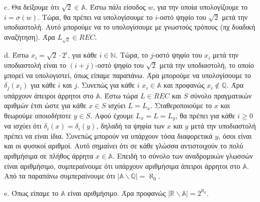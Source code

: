 \documentclass[a4paper, oneside, 11pt]{article}
\theoremstyle{definition}
\begin{document}
c. Θα δείξουμε ότι $\sqrt{2}\in \mathbb{A}$. Έστω πάλι είσοδος $w$, για την οποία υπολογίζουμε το 
$i=\sigma(w)$. Τώρα, θα πρέπει να υπολογίσουμε το $i$-οστό ψηφίο του $\sqrt{2}$ μετά την υποδιαστολή.
Αυτό μπορούμε να το υπολογίσουμε με γνωστούς τρόπους (πχ δυαδική αναζήτηση). Άρα $L_{\sqrt{2}}\in REC$.

d. Έστω $x_i=\sqrt{2}\cdot 2^i$, για κάθε $i\in \mathbb{N}$. Τώρα, το $j$-οστό ψηφίο του $x_i$ μετά την
υποδιαστολή είναι το $(i+j)$-οστό ψηφίο του $\sqrt{2}$ μετά την υποδιαστολή, το οποίο μπορεί να υπολογιστεί,
όπως είπαμε παραπάνω. Άρα μπορούμε να υπολογίσουμε το $\delta_j(x_i)$ για κάθε $i$ και $j$. Συνεπώς για κάθε
$i$ $x_i\in \mathbb{A}$ και προφανώς $x_i\notin \mathbb{Q}$. Άρα υπάρχουν άπειροι άρρητοι στο $\mathbb{A}$.
Έστω τώρα $L\in REC$ και $S$ σύνολο πραγματικών αριθμών έτσι ώστε για κάθε $x\in S$ ισχύει $L=L_x$. 
Σταθεροποιούμε το $x$ και θεωρούμε οποιοδήποτε $y\in S$. Αφού έχουμε $L_x=L=L_y$, θα πρέπει για κάθε $i\geq 0$
να ισχύει ότι $\delta_i(x)=\delta_i(y)$, δηλαδή τα ψηφία των $x$ και $y$ μετά την υποδιαστολή πρέπει να είναι
ίδια. Συνεπώς μπορούν να υπάρχουν τόσα διαφορετικά $y$, όσοι είναι και οι φυσικοί αριθμοί. Αυτό σημαίνει ότι
σε κάθε γλώσσα αντιστοιχούν το πολύ αριθμήσιμα σε πλήθος άρρητα $x\in \mathbb{A}$. Επειδή το σύνολο των
αναδρομικών γλωσσών είναι αριθμήσιμο, συμπεραίνουμε ότι υπάρχουν αριθμήσιμα άπειροι άρρητοι στο $\mathbb{A}$.
Από τα παραπάνω συμπεραίνουμε ότι $|\mathbb{A}\backslash\mathbb{Q}|=\aleph_0$.

e. Όπως είπαμε το $\mathbb{A}$ είναι αριθμήσιμο. Άρα προφανώς $|\mathbb{R}\backslash\mathbb{A}|=2^{\aleph_0}$.
\end{document}

